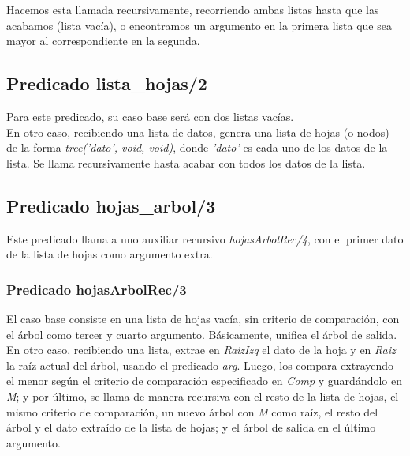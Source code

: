 \documentclass[12pt, a4paper, spanish]{article}
\begin{document}
Hacemos esta llamada recursivamente, recorriendo ambas listas hasta que las acabamos (lista vacía), o encontramos un argumento en la primera lista que sea mayor al correspondiente en la segunda.

\subsection{Predicado lista\_hojas/2}


Para este predicado, su caso base será con dos listas vacías.\\

En otro caso, recibiendo una lista de datos, genera una lista de hojas (o nodos) de la forma \textit{tree('dato', void, void)}, donde \textit{'dato'} es cada uno de los datos de la lista. Se llama recursivamente hasta acabar con todos los datos de la lista.

\newpage
\subsection{Predicado hojas\_arbol/3}


Este predicado llama a uno auxiliar recursivo \textit{hojasArbolRec/4}, con el primer dato de la lista de hojas como argumento extra.

\subsubsection{Predicado hojasArbolRec/3}


El caso base consiste en una lista de hojas vacía, sin criterio de comparación, con el árbol como tercer y cuarto argumento. Básicamente, unifica el árbol de salida.\\

En otro caso, recibiendo una lista, extrae en \textit{RaizIzq} el dato de la hoja y en \textit{Raiz} la raíz actual del árbol, usando el predicado \textit{arg}. Luego, los compara extrayendo el menor según el criterio de comparación especificado en \textit{Comp} y guardándolo en \textit{M}; y por último, se llama de manera recursiva con el resto de la lista de hojas, el mismo criterio de comparación, un nuevo árbol con \textit{M} como raíz, el resto del árbol y el dato extraído de la lista de hojas; y el árbol de salida en el último argumento.\\
\end{document}
